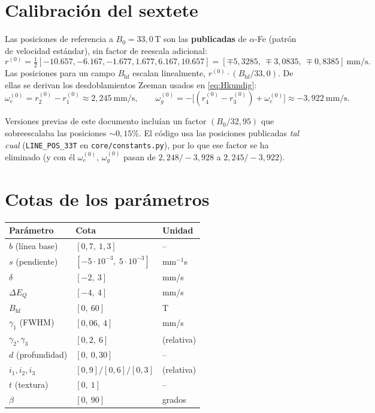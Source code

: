 \documentclass[11pt,a4paper]{article}
\newcommand{\BHF}{B_{\mathrm{hf}}}
\newcommand{\dEQ}{\Delta E_{Q}}
\newcommand{\code}[1]{\texttt{\small #1}}
\begin{document}
\section{Calibración del sextete}\label{ap:calib}
Las posiciones de referencia a $B_0=33{,}0\,$T son las \textbf{publicadas} de
$\alpha$-Fe (patrón de velocidad estándar), sin factor de reescala adicional:
\begin{equation}
  r^{(0)}=\tfrac12[-10.657,-6.167,-1.677,1.677,6.167,10.657]
        = [\mp5{,}3285,\ \mp3{,}0835,\ \mp0{,}8385]\ \text{mm/s}.
\end{equation}
Las posiciones para un campo $\BHF$ escalan linealmente, $r^{(0)}\cdot(\BHF/33{,}0)$.
De ellas se derivan los desdoblamientos Zeeman usados en \eqref{eq:Hkundig}:
\begin{equation}
  \omega_e^{(0)} = r^{(0)}_2-r^{(0)}_1 \approx 2{,}245\ \text{mm/s},\qquad
  \omega_g^{(0)} = -\bigl[(r^{(0)}_4-r^{(0)}_3)+\omega_e^{(0)}\bigr] \approx -3{,}922\ \text{mm/s}.
\end{equation}
\begin{nota}
Versiones previas de este documento incluían un factor $(B_0/32{,}95)$ que
sobreescalaba las posiciones $\sim0{,}15\%$. El código usa las posiciones
publicadas \emph{tal cual} (\code{LINE\_POS\_33T} en \code{core/constants.py}),
por lo que ese factor se ha eliminado (y con él $\omega_e^{(0)}$, $\omega_g^{(0)}$
pasan de $2{,}248/-3{,}928$ a $2{,}245/-3{,}922$).
\end{nota}

\section{Cotas de los parámetros}\label{ap:bounds}
\begin{center}
\begin{tabular}{@{}lll@{}}
\toprule
Parámetro & Cota & Unidad\\
\midrule
$b$ (línea base) & $[0{,}7,\ 1{,}3]$ & --\\
$s$ (pendiente) & $[-5\cdot10^{-3},\ 5\cdot10^{-3}]$ & mm$^{-1}$s\\
$\delta$ & $[-2,\ 3]$ & mm/s\\
$\dEQ$ & $[-4,\ 4]$ & mm/s\\
$\BHF$ & $[0,\ 60]$ & T\\
$\gamma_1$ (FWHM) & $[0{,}06,\ 4]$ & mm/s\\
$\gamma_2,\gamma_3$ & $[0{,}2,\ 6]$ & (relativa)\\
$d$ (profundidad) & $[0,\ 0{,}30]$ & --\\
$i_1,i_2,i_3$ & $[0,9]/[0,6]/[0,3]$ & (relativa)\\
$t$ (textura) & $[0,\ 1]$ & --\\
$\beta$ & $[0,\ 90]$ & grados\\
\bottomrule
\end{tabular}
\end{center}
\end{document}
